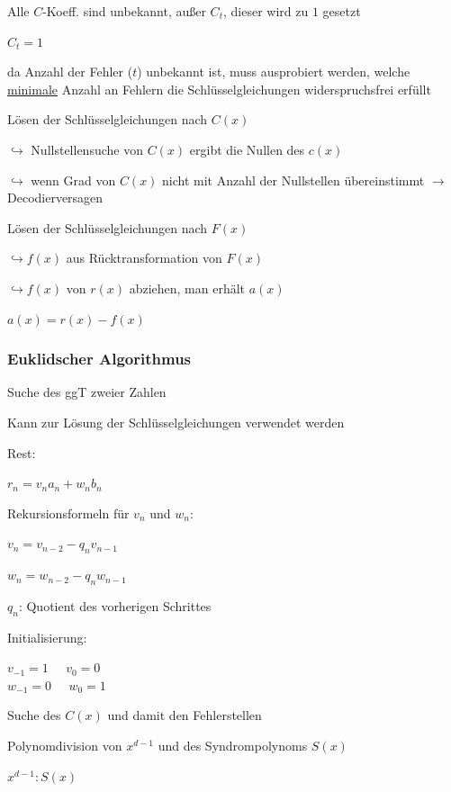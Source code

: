 Alle $C$-Koeff. sind unbekannt, außer $C_{t}$, dieser wird zu $1$ gesetzt

$\displaystyle{
    C_{t} = 1
}$

da Anzahl der Fehler ($t$) unbekannt ist, muss ausprobiert werden, welche \underline{minimale} Anzahl an Fehlern
die Schlüsselgleichungen widerspruchsfrei erfüllt

Lösen der Schlüsselgleichungen nach $C(x)$

$\hookrightarrow$ Nullstellensuche von $C(x)$ ergibt die Nullen des $c(x)$

$\hookrightarrow$ wenn Grad von $C(x)$ nicht mit Anzahl der Nullstellen übereinstimmt $\rightarrow$ Decodierversagen

Lösen der Schlüsselgleichungen nach $F(x)$

$\hookrightarrow f(x)$ aus Rücktransformation von $F(x)$

$\hookrightarrow f(x)$ von $r(x)$ abziehen, man erhält $a(x)$

$\displaystyle{
    a(x) = r(x) - f(x)
}$


\subsubsection{Euklidscher Algorithmus}

Suche des ggT zweier Zahlen

Kann zur Lösung der Schlüsselgleichungen verwendet werden

Rest:

$\displaystyle{
    r_n = v_n a_n + w_n b_n
}$

Rekursionsformeln für $v_n$ und $w_n$:

$\displaystyle{
    v_n = v_{n-2} - q_n v_{n-1}
}$

$\displaystyle{
    w_n = w_{n-2} - q_n w_{n-1}
}$

$q_n$: Quotient des vorherigen Schrittes

Initialisierung:

$\displaystyle{
    v_{-1} = 1 \;\;\;\;\; v_0 = 0
}$\\
$\displaystyle{
    w_{-1} = 0 \;\;\;\;\; w_0 = 1
}$

Suche des $C(x)$ und damit den Fehlerstellen

Polynomdivision von $x^{d-1}$ und des Syndrompolynoms $S(x)$

$\displaystyle{
    x^{d-1} : S(x)
}$

